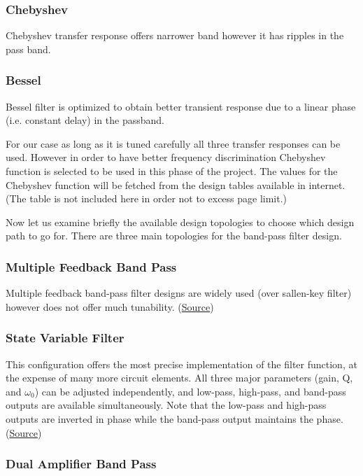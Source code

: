 \documentclass[letterpaper,12pt]{article}
\begin{document}
\subsubsection{Chebyshev}
Chebyshev transfer response offers narrower band however it has ripples in the pass band.
\subsubsection{Bessel}
Bessel filter is optimized to obtain better transient response due to a linear phase (i.e.
constant delay) in the passband.

\vspace{4mm}
For our case as long as it is tuned carefully all three transfer responses can be used. However in order to have  better frequency discrimination Chebyshev function is selected to be used in this phase of the project. The values for the Chebyshev function will be fetched from the design tables available in internet. (The table is not included here in order not to excess page limit.)

\vspace{4mm}
Now let us examine briefly the available design topologies to choose which design path to go for. There are three main topologies for the  band-pass filter design.

\subsubsection{Multiple Feedback Band Pass}
Multiple feedback band-pass filter designs are widely used (over sallen-key filter) however does not offer much tunability. (\href{https://www.analog.com/media/en/training-seminars/tutorials/mt-220.pdf}{Source})

\subsubsection{State Variable Filter}

This configuration offers the most precise implementation
of the filter function, at the expense of many more circuit
elements. All three major parameters (gain, Q, and \(\omega_0\)) can be adjusted independently, and low-pass, high-pass, and band-pass outputs are available simultaneously. Note that the low-pass and high-pass outputs are inverted in phase while the band-pass output maintains the phase. (\href{https://www.analog.com/media/en/training-seminars/tutorials/MT-223.pdf}{Source})

\subsubsection{Dual Amplifier Band Pass}
\end{document}
